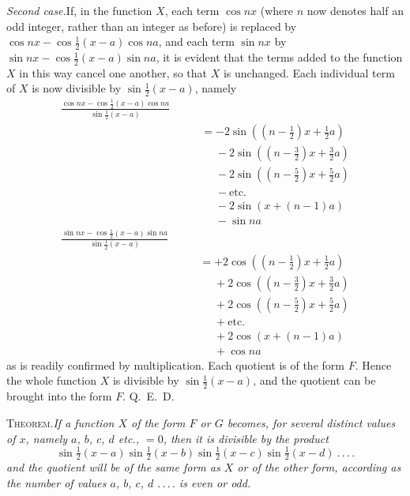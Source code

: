 \textit{Second case.}\quad If, in the function $X$, each term $\cos nx$ (where $n$ now denotes half an odd integer, rather than an integer as before) is replaced by $\cos nx-\cos\tfrac12(x-a)\cos na$, and each term $\sin nx$ by $\sin nx-\cos\tfrac12(x-a)\sin na$, it is evident that the terms added to the function $X$ in this way cancel one another, so that $X$ is unchanged. Each individual term of $X$ is now divisible by $\sin\tfrac12(x-a)$, namely
\[
\begin{aligned}
\frac{\cos nx-\cos\tfrac12(x-a)\cos na}{\sin\tfrac12(x-a)}\qquad\\[5pt]&=-2\sin((n-\tfrac12)x+\tfrac12a)\\[5pt]
&\phantom{=}{-}2\sin((n-\tfrac32)x+\tfrac32a)\\[5pt]
&\phantom{=}{-}2\sin((n-\tfrac52)x+\tfrac52a)\\[5pt]
&\phantom{=}{-}\text{etc.}\\[5pt]
&\phantom{=}{-}2\sin(x+(n-1)a)\\[5pt]
&\phantom{=}{-}\sin na
\end{aligned}
\]
\[
\begin{aligned}
\frac{\sin nx-\cos\tfrac12(x-a)\sin na}{\sin\tfrac12(x-a)}\qquad\\[5pt]&=+2\cos((n-\tfrac12)x+\tfrac12a)\\[5pt]
&\phantom{=}{+}2\cos((n-\tfrac32)x+\tfrac32a)\\[5pt]
&\phantom{=}{+}2\cos((n-\tfrac52)x+\tfrac52a)\\[5pt]
&\phantom{=}{+}\text{etc.}\\[5pt]
&\phantom{=}{+}2\cos(x+(n-1)a)\\[5pt]
&\phantom{=}{+}\cos na
\end{aligned}
\]
as is readily confirmed by multiplication. Each quotient is of the form $F$. Hence the whole function $X$ is divisible by $\sin\tfrac12(x-a)$, and the quotient can be brought into the form $F$. Q.~E.~D.

\textsc{Theorem.}\quad\textit{If a function $X$ of the form $F$ or $G$ becomes, for several distinct values of $x$, namely $a$, $b$, $c$, $d$ etc., $=0$, then it is divisible by the product}
\[
\sin\tfrac12(x-a)\sin\tfrac12(x-b)\sin\tfrac12(x-c)\sin\tfrac12(x-d)\ .\,.\,.\,.
\]
\textit{and the quotient will be of the same form as $X$ or of the other form, according as the number of values $a$, $b$, $c$, $d$ $.\,.\,.\,.$ is even or odd.}

